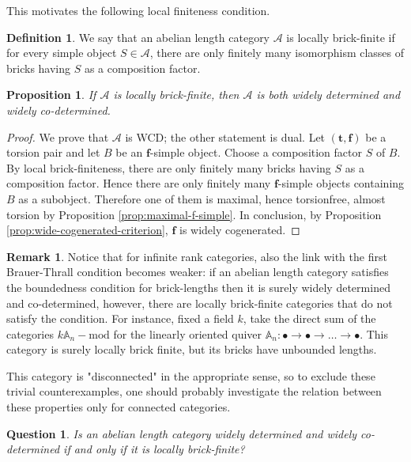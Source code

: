 \documentclass[11pt]{amsart}
\newtheorem{proposition}[theorem]{Proposition}
\newtheorem{question}[theorem]{Question}
\theoremstyle{definition}
\newtheorem{definition}[theorem]{Definition}
\newtheorem{remark}[theorem]{Remark}
\newcommand{\A}{\mathcal A}
\begin{document}
This motivates the following local finiteness condition.

\begin{definition}
We say that an abelian length category \(\A\) is locally brick-finite if for every simple object \(S\in\A\), there are only finitely many isomorphism classes of bricks having \(S\) as a composition factor.
\end{definition}

\begin{proposition}\label{prop:locally-brick-finite-WD-WCD}
If \(\A\) is locally brick-finite, then \(\A\) is both widely determined and widely co-determined.
\end{proposition}

\begin{proof}
We prove that \(\A\) is WCD; the other statement is dual. Let \((\mathbf t,\mathbf f)\) be a torsion pair and let \(B\) be an \(\mathbf f\)-simple object. Choose a composition factor \(S\) of \(B\). By local brick-finiteness, there are only finitely many bricks having \(S\) as a composition factor. Hence there are only finitely many \(\mathbf f\)-simple objects containing \(B\) as a subobject. Therefore one of them is maximal, hence torsionfree, almost torsion by Proposition \ref{prop:maximal-f-simple}. In conclusion, by Proposition \ref{prop:wide-cogenerated-criterion}, \(\mathbf f\) is widely cogenerated.
\end{proof}

\begin{remark}
Notice that for infinite rank categories, also the link with the first Brauer-Thrall condition becomes weaker: if an abelian length category satisfies the boundedness condition for brick-lengths then it is surely widely determined and co-determined, however, there are locally brick-finite categories that do not satisfy the condition. For instance, fixed a field $ k $, take the direct sum of the categories $ k\mathbb{A}_n-\mathrm{mod} $ for the linearly oriented quiver $ \mathbb{A}_n : \bullet \to \bullet \to \dots \to \bullet $. This category is surely locally brick finite, but its bricks have unbounded lengths.

This category is "disconnected" in the appropriate sense, so to exclude these trivial counterexamples, one should probably investigate the relation between these properties only for connected categories.
\end{remark}

\begin{question}
Is an abelian length category widely determined and widely co-determined if and only if it is locally brick-finite?
\end{question}
\end{document}
